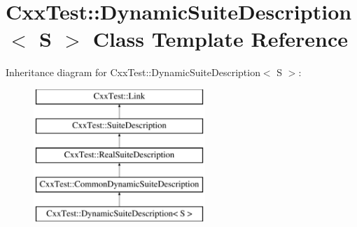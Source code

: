 \hypertarget{classCxxTest_1_1DynamicSuiteDescription}{\section{Cxx\-Test\-:\-:Dynamic\-Suite\-Description$<$ S $>$ Class Template Reference}
\label{classCxxTest_1_1DynamicSuiteDescription}
}
Inheritance diagram for Cxx\-Test\-:\-:Dynamic\-Suite\-Description$<$ S $>$\-:\begin{figure}[H]
\begin{center}
\leavevmode
\includegraphics[height=5.000000cm]{classCxxTest_1_1DynamicSuiteDescription}
\end{center}
\end{figure}

